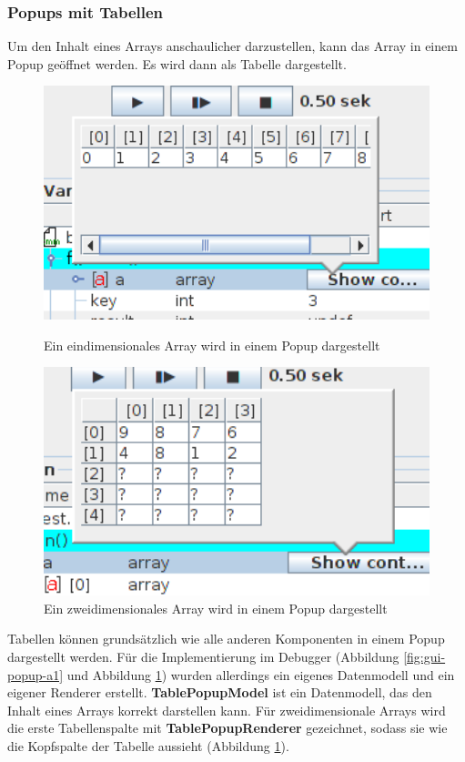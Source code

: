 \subsubsection*{Popups mit Tabellen}
Um den Inhalt eines Arrays anschaulicher darzustellen, kann das Array in einem Popup geöffnet werden. Es wird dann als Tabelle dargestellt.

\begin{figure}[h!]
\centering
	\begin{minipage}{0.45\textwidth}
		\centering
		\includegraphics[width=1.0\textwidth]{./media/images/gui/popup/array1dim.png}
		\caption{Ein eindimensionales Array wird in einem Popup dargestellt}
		\label{fig:gui-popup-a1}
	\end{minipage}\hfill
	\begin{minipage}{0.46\textwidth}
		\centering
		\includegraphics[width=1.0\textwidth]{./media/images/gui/popup/array2dim.png}
		\caption{Ein zweidimensionales Array wird in einem Popup dargestellt}
		\label{fig:gui-popup-a2}
	\end{minipage}
\end{figure}

Tabellen können grundsätzlich wie alle anderen Komponenten in einem Popup dargestellt werden. Für die Implementierung im Debugger (Abbildung \ref{fig:gui-popup-a1} und Abbildung \ref{fig:gui-popup-a2}) wurden allerdings ein eigenes Datenmodell und ein eigener Renderer erstellt. \textbf{TablePopupModel} ist ein Datenmodell, das den Inhalt eines Arrays korrekt darstellen kann. Für zweidimensionale Arrays wird die erste Tabellenspalte mit \textbf{TablePopupRenderer} gezeichnet, sodass sie wie die Kopfspalte der Tabelle aussieht (Abbildung \ref{fig:gui-popup-a2}).


